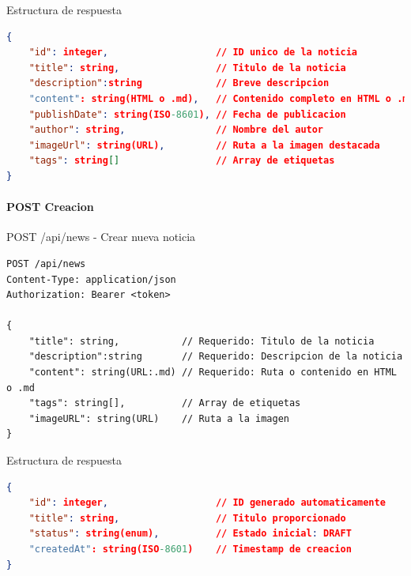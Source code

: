 \documentclass[11pt,a4paper]{article}
\begin{document}
\begin{center}
	\begin{minipage}{\textwidth}
		\begin{codebox}{Estructura de respuesta}
			\begin{lstlisting}[language=json]
{
    "id": integer,                   // ID unico de la noticia
    "title": string,                 // Titulo de la noticia
	"description":string  			 // Breve descripcion
    "content": string(HTML o .md),   // Contenido completo en HTML o .md
    "publishDate": string(ISO-8601), // Fecha de publicacion
    "author": string,                // Nombre del autor
    "imageUrl": string(URL),         // Ruta a la imagen destacada
    "tags": string[]                 // Array de etiquetas
}
\end{lstlisting}
		\end{codebox}
	\end{minipage}
\end{center}

\paragraph{POST Creacion}
\begin{center}
	\begin{minipage}{\textwidth}
		\begin{codebox}{POST /api/news - Crear nueva noticia}
			\begin{lstlisting}[language=HTTP]
POST /api/news
Content-Type: application/json
Authorization: Bearer <token>

{
    "title": string,           // Requerido: Titulo de la noticia
	"description":string  	   // Requerido: Descripcion de la noticia
    "content": string(URL:.md) // Requerido: Ruta o contenido en HTML o .md
    "tags": string[],          // Array de etiquetas 
    "imageURL": string(URL)    // Ruta a la imagen
}
\end{lstlisting}
		\end{codebox}
	\end{minipage}
\end{center}

\begin{center}
	\begin{minipage}{\textwidth}
		\begin{codebox}{Estructura de respuesta}
			\begin{lstlisting}[language=json]
{
    "id": integer,                   // ID generado automaticamente
    "title": string,                 // Titulo proporcionado
    "status": string(enum),          // Estado inicial: DRAFT
    "createdAt": string(ISO-8601)    // Timestamp de creacion
}
\end{lstlisting}
		\end{codebox}
	\end{minipage}
\end{center}
\end{document}
